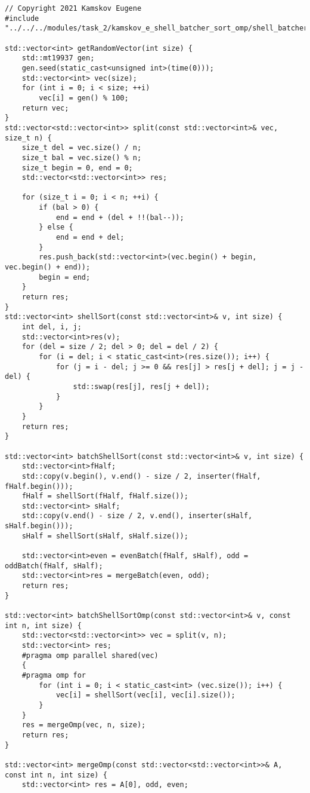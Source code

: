 \documentclass{report}
\begin{document}
\begin{lstlisting}
// Copyright 2021 Kamskov Eugene
#include "../../../modules/task_2/kamskov_e_shell_batcher_sort_omp/shell_batcher.h"

std::vector<int> getRandomVector(int size) {
    std::mt19937 gen;
    gen.seed(static_cast<unsigned int>(time(0)));
    std::vector<int> vec(size);
    for (int i = 0; i < size; ++i)
        vec[i] = gen() % 100;
    return vec;
}
std::vector<std::vector<int>> split(const std::vector<int>& vec, size_t n) {
    size_t del = vec.size() / n;
    size_t bal = vec.size() % n;
    size_t begin = 0, end = 0;
    std::vector<std::vector<int>> res;

    for (size_t i = 0; i < n; ++i) {
        if (bal > 0) {
            end = end + (del + !!(bal--));
        } else {
            end = end + del;
        }
        res.push_back(std::vector<int>(vec.begin() + begin, vec.begin() + end));
        begin = end;
    }
    return res;
}
std::vector<int> shellSort(const std::vector<int>& v, int size) {
    int del, i, j;
    std::vector<int>res(v);
    for (del = size / 2; del > 0; del = del / 2) {
        for (i = del; i < static_cast<int>(res.size()); i++) {
            for (j = i - del; j >= 0 && res[j] > res[j + del]; j = j - del) {
                std::swap(res[j], res[j + del]);
            }
        }
    }
    return res;
}

std::vector<int> batchShellSort(const std::vector<int>& v, int size) {
    std::vector<int>fHalf;
    std::copy(v.begin(), v.end() - size / 2, inserter(fHalf, fHalf.begin()));
    fHalf = shellSort(fHalf, fHalf.size());
    std::vector<int> sHalf;
    std::copy(v.end() - size / 2, v.end(), inserter(sHalf, sHalf.begin()));
    sHalf = shellSort(sHalf, sHalf.size());

    std::vector<int>even = evenBatch(fHalf, sHalf), odd = oddBatch(fHalf, sHalf);
    std::vector<int>res = mergeBatch(even, odd);
    return res;
}

std::vector<int> batchShellSortOmp(const std::vector<int>& v, const int n, int size) {
    std::vector<std::vector<int>> vec = split(v, n);
    std::vector<int> res;
    #pragma omp parallel shared(vec)
    {
    #pragma omp for
        for (int i = 0; i < static_cast<int> (vec.size()); i++) {
            vec[i] = shellSort(vec[i], vec[i].size());
        }
    }
    res = mergeOmp(vec, n, size);
    return res;
}

std::vector<int> mergeOmp(const std::vector<std::vector<int>>& A, const int n, int size) {
    std::vector<int> res = A[0], odd, even;


\end{lstlisting}
\end{document}
